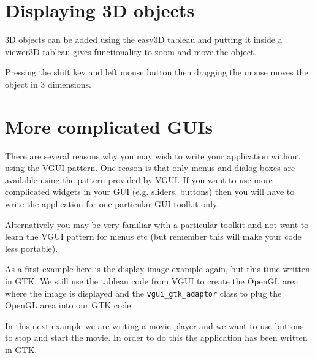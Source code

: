 \documentclass[12pt]{report}
\newcommand{\FSMinput}[1]{}
\begin{document}
\chapter{Displaying 3D objects}
3D objects can be added using the easy3D tableau and putting it inside a viewer3D tableau 
gives functionality to zoom and move the object.

Pressing the shift key and left mouse button then dragging the mouse moves the object in 
3 dimensions.
\FSMinput{3d-example}



\chapter{More complicated GUIs}

There are several reasons why you may wish to write your application without using
the VGUI pattern.  One reason is that only menus and dialog boxes are available using 
the pattern provided by VGUI. If you want to use more complicated widgets in your
GUI (e.g. sliders, buttons) then you will have to write the application for one 
particular GUI toolkit only.  

Alternatively you may be very familiar with a particular toolkit and not want to learn
the VGUI pattern for menus etc (but remember this will make your code less portable).

As a first example here is the display image example again, but this time written in GTK.
We still use the tableau code from VGUI to create the OpenGL area where the image is 
displayed and the {\tt vgui\_gtk\_adaptor} class to plug the OpenGL area into our GTK code.

\FSMinput{gtk-display-image}

In this next example we are writing a movie player and we want to use
buttons to stop and start the movie.  In order to do this the application 
has been written in GTK.

\FSMinput{gtk-movie-player}
\end{document}
